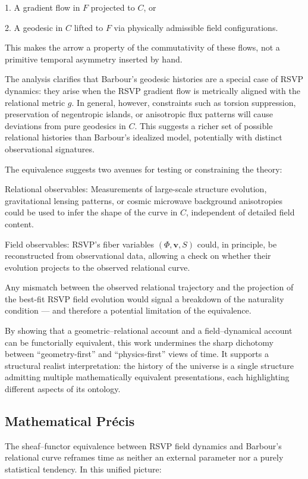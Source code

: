 \documentclass[11pt]{article}
\theoremstyle{plain}
\theoremstyle{definition}
\begin{document}
1. A gradient flow in $F$ projected to $C$, or

2. A geodesic in $C$ lifted to $F$ via physically admissible field configurations.

This makes the arrow a property of the commutativity of these flows, not a primitive temporal asymmetry inserted by hand.

The analysis clarifies that Barbour’s geodesic histories are a special case of RSVP dynamics: they arise when the RSVP gradient flow is metrically aligned with the relational metric $g$. In general, however, constraints such as torsion suppression, preservation of negentropic islands, or anisotropic flux patterns will cause deviations from pure geodesics in $C$. This suggests a richer set of possible relational histories than Barbour’s idealized model, potentially with distinct observational signatures.

The equivalence suggests two avenues for testing or constraining the theory:

Relational observables: Measurements of large-scale structure evolution, gravitational lensing patterns, or cosmic microwave background anisotropies could be used to infer the shape of the curve in $C$, independent of detailed field content.

Field observables: RSVP’s fiber variables $(\Phi, \mathbf{v}, S)$ could, in principle, be reconstructed from observational data, allowing a check on whether their evolution projects to the observed relational curve.

Any mismatch between the observed relational trajectory and the projection of the best-fit RSVP field evolution would signal a breakdown of the naturality condition — and therefore a potential limitation of the equivalence.

By showing that a geometric–relational account and a field–dynamical account can be functorially equivalent, this work undermines the sharp dichotomy between “geometry-first” and “physics-first” views of time. It supports a structural realist interpretation: the history of the universe is a single structure admitting multiple mathematically equivalent presentations, each highlighting different aspects of its ontology.

\subsection{Mathematical Précis}
The sheaf–functor equivalence between RSVP field dynamics and Barbour’s relational curve reframes time as neither an external parameter nor a purely statistical tendency. In this unified picture:
\end{document}
